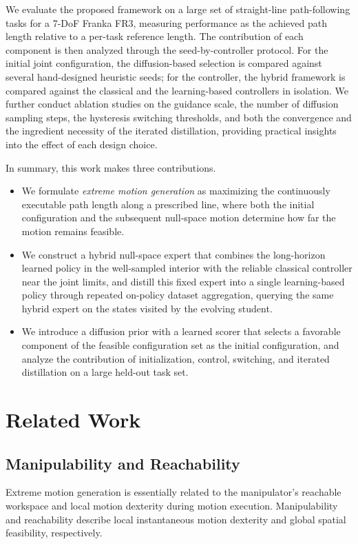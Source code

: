 \documentclass[journal, twoside]{IEEEtran}
\begin{document}
We evaluate the proposed framework on a large set of straight-line path-following tasks for a 7-DoF Franka FR3, measuring performance as the achieved path length relative to a per-task reference length. The contribution of each component is then analyzed through the seed-by-controller protocol. For the initial joint configuration, the diffusion-based selection is compared against several hand-designed heuristic seeds; for the controller, the hybrid framework is compared against the classical and the learning-based controllers in isolation. We further conduct ablation studies on the guidance scale, the number of diffusion sampling steps, the hysteresis switching thresholds, and both the convergence and the ingredient necessity of the iterated distillation, providing practical insights into the effect of each design choice.

In summary, this work makes three contributions.
\begin{itemize}
\item We formulate \emph{extreme motion generation} as maximizing the continuously executable path length along a prescribed line, where both the initial configuration and the subsequent null-space motion determine how far the motion remains feasible.
\item We construct a hybrid null-space expert that combines the long-horizon learned policy in the well-sampled interior with the reliable classical controller near the joint limits, and distill this fixed expert into a single learning-based policy through repeated on-policy dataset aggregation, querying the same hybrid expert on the states visited by the evolving student.
\item We introduce a diffusion prior with a learned scorer that selects a favorable component of the feasible configuration set as the initial configuration, and analyze the contribution of initialization, control, switching, and iterated distillation on a large held-out task set.
\end{itemize}

\section{Related Work}

\subsection{Manipulability and Reachability}
Extreme motion generation is essentially related to the manipulator's reachable workspace and local motion dexterity during motion execution. Manipulability and reachability describe local instantaneous motion dexterity and global spatial feasibility, respectively.
\end{document}

